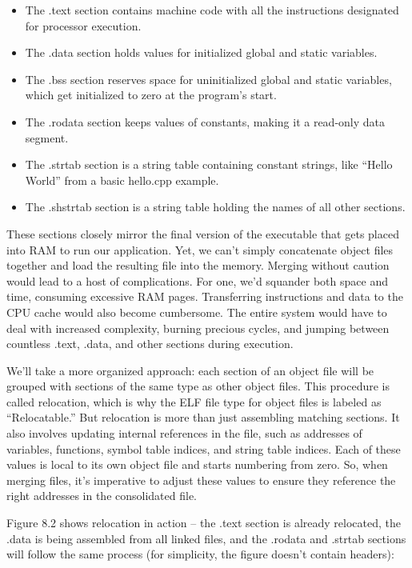 \begin{itemize}
\item
The .text section contains machine code with all the instructions designated for processor execution.

\item
The .data section holds values for initialized global and static variables.

\item
The .bss section reserves space for uninitialized global and static variables, which get initialized to zero at the program’s start.

\item
The .rodata section keeps values of constants, making it a read-only data segment.

\item
The .strtab section is a string table containing constant strings, like “Hello World” from a basic hello.cpp example.

\item
The .shstrtab section is a string table holding the names of all other sections.
\end{itemize}

These sections closely mirror the final version of the executable that gets placed into RAM to run our application. Yet, we can’t simply concatenate object files together and load the resulting file into the memory. Merging without caution would lead to a host of complications. For one, we’d squander both space and time, consuming excessive RAM pages. Transferring instructions and data to the CPU cache would also become cumbersome. The entire system would have to deal with increased complexity, burning precious cycles, and jumping between countless .text, .data, and other sections during execution.

We’ll take a more organized approach: each section of an object file will be grouped with sections of the same type as other object files. This procedure is called relocation, which is why the ELF file type for object files is labeled as “Relocatable.” But relocation is more than just assembling matching sections. It also involves updating internal references in the file, such as addresses of variables, functions, symbol table indices, and string table indices. Each of these values is local to its own object file and starts numbering from zero. So, when merging files, it’s imperative to adjust these values to ensure they reference the right addresses in the consolidated file.

Figure 8.2 shows relocation in action – the .text section is already relocated, the .data is being assembled from all linked files, and the .rodata and .strtab sections will follow the same process (for simplicity, the figure doesn’t contain headers):

